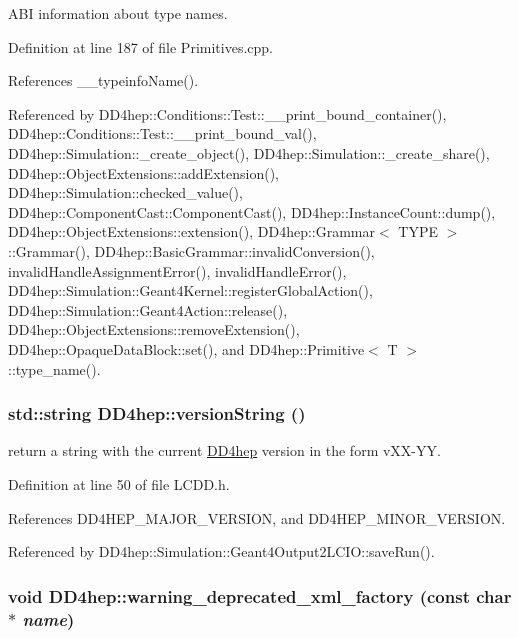 ABI information about type names. 

Definition at line 187 of file Primitives.cpp.

References \_\-\_\-typeinfoName().

Referenced by DD4hep::Conditions::Test::\_\-\_\-print\_\-bound\_\-container(), DD4hep::Conditions::Test::\_\-\_\-print\_\-bound\_\-val(), DD4hep::Simulation::\_\-create\_\-object(), DD4hep::Simulation::\_\-create\_\-share(), DD4hep::ObjectExtensions::addExtension(), DD4hep::Simulation::checked\_\-value(), DD4hep::ComponentCast::ComponentCast(), DD4hep::InstanceCount::dump(), DD4hep::ObjectExtensions::extension(), DD4hep::Grammar$<$ TYPE $>$::Grammar(), DD4hep::BasicGrammar::invalidConversion(), invalidHandleAssignmentError(), invalidHandleError(), DD4hep::Simulation::Geant4Kernel::registerGlobalAction(), DD4hep::Simulation::Geant4Action::release(), DD4hep::ObjectExtensions::removeExtension(), DD4hep::OpaqueDataBlock::set(), and DD4hep::Primitive$<$ T $>$::type\_\-name().\hypertarget{namespace_d_d4hep_ad8fb70d431a1af32b6220b348af93c60}{
\subsubsection[{versionString}]{\setlength{\rightskip}{0pt plus 5cm}std::string DD4hep::versionString ()}}
\label{namespace_d_d4hep_ad8fb70d431a1af32b6220b348af93c60}


return a string with the current \hyperlink{namespace_d_d4hep}{DD4hep} version in the form vXX-\/YY. 

Definition at line 50 of file LCDD.h.

References DD4HEP\_\-MAJOR\_\-VERSION, and DD4HEP\_\-MINOR\_\-VERSION.

Referenced by DD4hep::Simulation::Geant4Output2LCIO::saveRun().\hypertarget{namespace_d_d4hep_a1726e0eed52fa5804e004e72e8c73775}{
\subsubsection[{warning\_\-deprecated\_\-xml\_\-factory}]{\setlength{\rightskip}{0pt plus 5cm}void DD4hep::warning\_\-deprecated\_\-xml\_\-factory (const char $\ast$ {\em name})}}
\label{namespace_d_d4hep_a1726e0eed52fa5804e004e72e8c73775}


